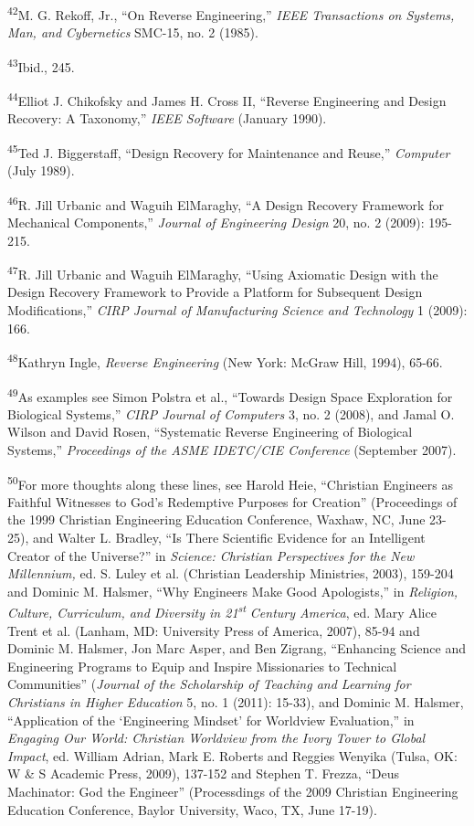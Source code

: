 \textsuperscript{42}M. G. Rekoff, Jr., “On Reverse Engineering,”
\textit{IEEE Transactions on Systems, Man, and Cybernetics} SMC-15, no.
2 (1985).


\textsuperscript{43}Ibid., 245.


\textsuperscript{44}Elliot J. Chikofsky and James H. Cross II, “Reverse
Engineering and Design Recovery: A Taxonomy,” \textit{IEEE Software}
(January 1990).


\textsuperscript{45}Ted J. Biggerstaff, “Design Recovery for Maintenance
and Reuse,” \textit{Computer} (July 1989).


\textsuperscript{46}R. Jill Urbanic and Waguih ElMaraghy, “A Design
Recovery Framework for Mechanical Components,” \textit{Journal of
Engineering Design} 20, no. 2 (2009): 195-215.


\textsuperscript{47}R. Jill Urbanic and Waguih ElMaraghy, “Using
Axiomatic Design with the Design Recovery Framework to Provide a
Platform for Subsequent Design Modifications,” \textit{CIRP Journal of
Manufacturing Science and Technology} 1 (2009): 166.


\textsuperscript{48}Kathryn Ingle, \textit{Reverse Engineering }(New
York: McGraw Hill, 1994), 65-66.


\textsuperscript{49}As examples see Simon Polstra et al., “Towards
Design Space Exploration for Biological Systems,” \textit{CIRP Journal
of Computers} 3, no. 2 (2008), and Jamal O. Wilson and David Rosen,
“Systematic Reverse Engineering of Biological Systems,”
\textit{Proceedings of the ASME IDETC/CIE Conference }(September
2007).


\textsuperscript{50}For more thoughts along these lines, see Harold
Heie, “Christian Engineers as Faithful Witnesses to God’s Redemptive
Purposes for Creation” (Proceedings of the 1999 Christian Engineering
Education Conference, Waxhaw, NC, June 23-25), and Walter L. Bradley,
“Is There Scientific Evidence for an Intelligent Creator of the
Universe?” in \textit{Science: Christian Perspectives for the New
Millennium, }ed. S. Luley et al. (Christian Leadership Ministries,
2003), 159-204\textit{ }and Dominic M. Halsmer, “Why Engineers Make
Good Apologists,” in \textit{Religion, Culture, Curriculum, and
Diversity in 21}\textit{\textsuperscript{st}}\textit{ Century America},
ed. Mary Alice Trent et al. (Lanham, MD: University Press of America,
2007), 85-94 and Dominic M. Halsmer, Jon Marc Asper, and Ben Zigrang,
“Enhancing Science and Engineering Programs to Equip and Inspire
Missionaries to Technical Communities” (\textit{Journal of the
Scholarship of Teaching and Learning for Christians in Higher
Education} 5, no. 1 (2011): 15-33), and\textit{ }Dominic M. Halsmer,
“Application of the ‘Engineering Mindset’ for Worldview Evaluation,” in
\textit{Engaging Our World: Christian Worldview from the Ivory Tower to
Global Impact}, ed. William Adrian, Mark E. Roberts and Reggies Wenyika
(Tulsa, OK: W \& S Academic Press, 2009), 137-152 and Stephen T.
Frezza, “Deus Machinator: God the Engineer” (Processdings of the 2009
Christian Engineering Education Conference, Baylor University, Waco,
TX, June 17-19).


